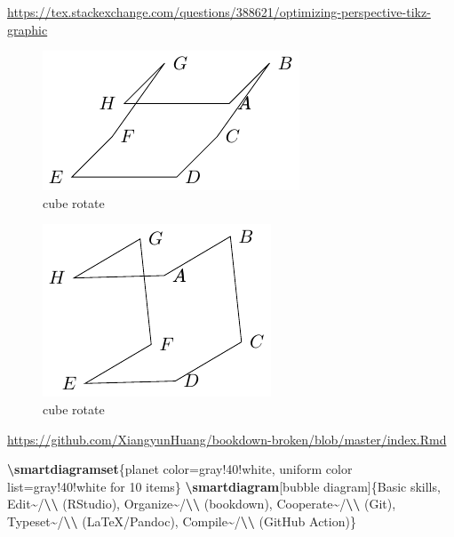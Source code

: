 \documentclass[
]{book}
\newenvironment{Shaded}{\begin{snugshade}}{\end{snugshade}}
\newcommand{\FunctionTok}[1]{\textcolor[rgb]{0.13,0.29,0.53}{\textbf{#1}}}
\newcommand{\NormalTok}[1]{#1}
\theoremstyle{definition}
\theoremstyle{definition}
\theoremstyle{definition}
\theoremstyle{definition}
\theoremstyle{remark}
\begin{document}
\url{https://tex.stackexchange.com/questions/388621/optimizing-perspective-tikz-graphic}

\begin{figure}
\includegraphics[width=0.75\linewidth]{202401311000-TikZ_files/figure-latex/unnamed-chunk-66-1} \caption{cube rotate}\label{fig:unnamed-chunk-66}
\end{figure}

\begin{figure}
\includegraphics[width=0.75\linewidth]{202401311000-TikZ_files/figure-latex/unnamed-chunk-67-1} \caption{cube rotate}\label{fig:unnamed-chunk-67}
\end{figure}

\url{https://github.com/XiangyunHuang/bookdown-broken/blob/master/index.Rmd}

\begin{Shaded}
\begin{Highlighting}[]
\FunctionTok{\textbackslash{}smartdiagramset}\NormalTok{\{planet color=gray!40!white, uniform color list=gray!40!white for 10 items\}}
\FunctionTok{\textbackslash{}smartdiagram}\NormalTok{[bubble diagram]\{Basic skills,}
\NormalTok{  Edit\textasciitilde{}/}\FunctionTok{\textbackslash{}\textbackslash{}}\NormalTok{ (RStudio), Organize\textasciitilde{}/}\FunctionTok{\textbackslash{}\textbackslash{}}\NormalTok{ (bookdown), Cooperate\textasciitilde{}/}\FunctionTok{\textbackslash{}\textbackslash{}}\NormalTok{ (Git), Typeset\textasciitilde{}/}\FunctionTok{\textbackslash{}\textbackslash{}}\NormalTok{ (LaTeX/Pandoc), Compile\textasciitilde{}/}\FunctionTok{\textbackslash{}\textbackslash{}}\NormalTok{ (GitHub Action)\}}
\end{Highlighting}
\end{Shaded}
\end{document}
